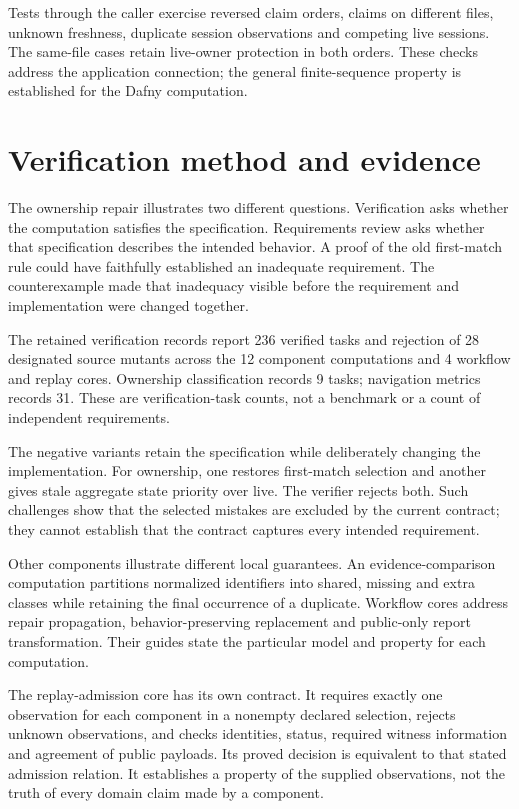 \documentclass[11pt]{article}
\newcommand{\formalcomponentcount}{12}
\newcommand{\workflowcorecount}{4}
\newcommand{\verifiedtaskcount}{236}
\newcommand{\mutantcount}{28}
\newcommand{\ownershiptaskcount}{9}
\newcommand{\navigationtaskcount}{31}
\begin{document}
Tests through the caller exercise reversed claim orders, claims on different
files, unknown freshness, duplicate session observations and competing live
sessions. The same-file cases retain live-owner protection in both orders.
These checks address the application connection; the general finite-sequence
property is established for the Dafny computation.

\section{Verification method and evidence}
\label{sec:evidence}
The ownership repair illustrates two different questions. Verification asks
whether the computation satisfies the specification. Requirements review asks
whether that specification describes the intended behavior. A proof of the old
first-match rule could have faithfully established an inadequate requirement.
The counterexample made that inadequacy visible before the requirement and
implementation were changed together.

The retained verification records report \verifiedtaskcount{} verified tasks
and rejection of \mutantcount{} designated source mutants across the
\formalcomponentcount{} component computations and \workflowcorecount{} workflow
and replay cores. Ownership classification records \ownershiptaskcount{} tasks;
navigation metrics records \navigationtaskcount{}. These are verification-task
counts, not a benchmark or a count of independent requirements.

The negative variants retain the specification while deliberately changing the
implementation. For ownership, one restores first-match selection and another
gives stale aggregate state priority over live. The verifier rejects both.
Such challenges show that the selected mistakes are excluded by the current
contract; they cannot establish that the contract captures every intended
requirement.

Other components illustrate different local guarantees. An evidence-comparison
computation partitions normalized identifiers into shared, missing and extra
classes while retaining the final occurrence of a duplicate. Workflow cores
address repair propagation, behavior-preserving replacement and public-only
report transformation. Their guides state the particular model and property
for each computation.

The replay-admission core has its own contract. It requires exactly one
observation for each component in a nonempty declared selection, rejects unknown
observations, and checks identities, status, required witness information and
agreement of public payloads. Its proved decision is equivalent to that stated
admission relation. It establishes a property of the supplied observations,
not the truth of every domain claim made by a component.
\end{document}
